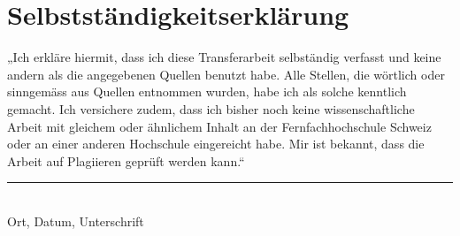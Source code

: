 
\chapter{Selbstständigkeitserklärung}
\label{chp:originality}

„Ich erkläre hiermit, dass ich diese Transferarbeit selbständig verfasst und keine andern als die angegebenen Quellen benutzt habe. Alle Stellen, die wörtlich oder sinngemäss aus Quellen entnommen wurden, habe ich als solche kenntlich gemacht. Ich versichere zudem, dass ich bisher noch keine wissenschaftliche Arbeit mit gleichem oder ähnlichem Inhalt an der Fernfachhochschule Schweiz oder an einer anderen Hochschule eingereicht habe. Mir ist bekannt, dass die Arbeit auf Plagiieren geprüft werden kann.“

\vspace{4cm}
\noindent 
\hrule \ \\[-0.5ex]
Ort, Datum, Unterschrift